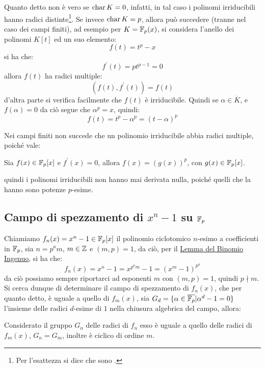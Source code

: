 \documentclass[11pt]{scrartcl}
\begin{document}
\begin{remark}
	Quanto detto non è vero se $\text{char}\, K = 0$, infatti, in tal caso i polinomi irriducibili hanno radici distinte\footnote{Per l'esattezza si dice che sono .}.
	Se invece $\text{char}\, K = p$, allora può succedere (tranne nel caso dei campi finiti), ad esempio per $K = {\mathbb F}_p(x)$, si considera l'anello dei polinomi $K[t]$ ed un suo elemento:
		\[f(t)=t^p-x
			\]
		si ha che:
		\[f^{\prime}(t)=pt^{p-1} = 0
			\]
	allora $f(t)$ ha radici multiple:
		\[ (f(t), f^{\prime}(t)) = f(t)
			\]
	d'altra parte si verifica facilmente che $f(t)$ è irriducibile. Quindi se $\alpha \in \overline K$, e $f(\alpha)=0$
	da ciò segue che $\alpha^p=x$, quindi:
		\[ f(t) = t^p - \alpha^p = (t-\alpha)^p
			\]
\end{remark}
	
Nei campi finiti non succede che un polinomio irriducibile abbia radici multiple, poiché vale:

\begin{theorem}
	Sia $f(x) \in {\mathbb F}_p[x]$ e $f^{\prime}(x) = 0$, allora $f(x)=(g(x))^p$,
	con $g(x)\in{\mathbb F}_p[x]$.
\end{theorem}

 quindi i polinomi irriducibili non hanno mai derivata nulla, poiché quelli che la hanno sono potenze $p$-esime.

\newpage
\subsection{Campo di spezzamento di $x^n-1$ su ${\mathbb F}_p$}
Chiamiamo $f_n(x)=x^n-1 \in {\mathbb F}_p[x]$ il polinomio ciclotomico $n$-esimo a coefficienti in ${\mathbb F}_p$,
sia $n=p^am$, $m \in \mathbb Z$ e $(m,p)=1$, da ciò, per il \hyperref[cf:bin]{Lemma del Binomio Ingenuo}, si ha che:
	\[f_n(x) = x^n - 1 = x^{p^am} - 1 = (x^m - 1)^{p^a}
		\]
da ciò possiamo sempre riportarci ad esponenti $m$ con $(m,p) = 1$, quindi $p \nmid m$. Si cerca dunque di
determinare il campo di spezzamento di $f_n(x)$, che per quanto detto, è uguale a quello di $f_m(x)$, sia 
$G_d = \{\alpha \in \overline{{\mathbb F}_p} | \alpha^d - 1 = 0\}$ l'insieme delle radici $d$-esime di $1$ nella chiusura algebrica del campo, allora:

\begin{lemma}
	\label{cf:lemma1}
	Considerato il gruppo $G_n$ delle radici di $f_n$ esso è uguale a quello delle radici di $f_m(x)$, $G_n = G_m$, inoltre è ciclico di ordine $m$.
\end{lemma}
\end{document}
